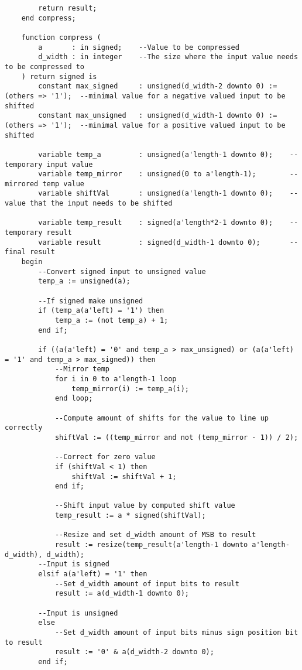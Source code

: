 \begin{lstlisting}
        return result;
    end compress;

    function compress (
        a       : in signed;    --Value to be compressed
        d_width : in integer    --The size where the input value needs to be compressed to
    ) return signed is
        constant max_signed     : unsigned(d_width-2 downto 0) := (others => '1');  --minimal value for a negative valued input to be shifted
        constant max_unsigned   : unsigned(d_width-1 downto 0) := (others => '1');  --minimal value for a positive valued input to be shifted

        variable temp_a         : unsigned(a'length-1 downto 0);    --temporary input value
        variable temp_mirror    : unsigned(0 to a'length-1);        --mirrored temp value
        variable shiftVal       : unsigned(a'length-1 downto 0);    --value that the input needs to be shifted

        variable temp_result    : signed(a'length*2-1 downto 0);    --temporary result
        variable result         : signed(d_width-1 downto 0);       --final result
    begin
        --Convert signed input to unsigned value
        temp_a := unsigned(a);

        --If signed make unsigned
        if (temp_a(a'left) = '1') then 
            temp_a := (not temp_a) + 1; 
        end if;

        if ((a(a'left) = '0' and temp_a > max_unsigned) or (a(a'left) = '1' and temp_a > max_signed)) then
            --Mirror temp
            for i in 0 to a'length-1 loop
                temp_mirror(i) := temp_a(i);
            end loop;

            --Compute amount of shifts for the value to line up correctly
            shiftVal := ((temp_mirror and not (temp_mirror - 1)) / 2);

            --Correct for zero value
            if (shiftVal < 1) then
                shiftVal := shiftVal + 1;
            end if;

            --Shift input value by computed shift value
            temp_result := a * signed(shiftVal);

            --Resize and set d_width amount of MSB to result
            result := resize(temp_result(a'length-1 downto a'length-d_width), d_width);
        --Input is signed
        elsif a(a'left) = '1' then
            --Set d_width amount of input bits to result
            result := a(d_width-1 downto 0);

        --Input is unsigned
        else
            --Set d_width amount of input bits minus sign position bit to result
            result := '0' & a(d_width-2 downto 0);
        end if;


\end{lstlisting}
